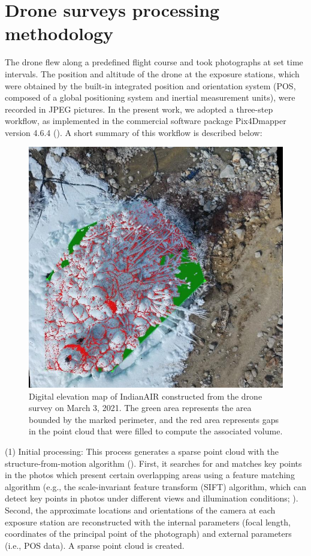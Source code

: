 \section{Drone surveys processing methodology}
\label{sec:drone_method}

The drone flew along a predefined flight course and took photographs at set time intervals. The
position and altitude of the drone at the exposure stations, which were obtained by the built-in integrated
position and orientation system (POS, composed of a global positioning system and inertial measurement units),
were recorded in JPEG pictures. In the present work, we adopted a three-step workflow, as implemented in the
commercial software package Pix4Dmapper version 4.6.4 (\cite{pix4dsaPix4DmapperUserManual2020}). A short summary of this workflow is
described below:

\begin{figure}
	\begin{center}
		\includegraphics[width=12 cm]{figs/pix4d.jpg}
	\end{center}
	\caption{Digital elevation map of Indian\ac{AIR} constructed from the drone survey on March 3, 2021. The green
		area represents the area bounded by the marked perimeter, and the red area represents gaps in the point cloud
    that were filled to compute the associated volume.
	}
	\label{fig:DEM}
\end{figure}

(1) Initial processing: This process generates a sparse point cloud with the structure-from-motion algorithm
(\cite{turnerAutomatedTechniqueGenerating2012}). First, it searches for and matches key points in the photos which present certain overlapping
areas using a feature matching algorithm (e.g., the scale-invariant feature transform (SIFT) algorithm, which can
detect key points in photos under different views and illumination conditions;
\cite{loweDistinctiveImageFeatures2004}). Second, the approximate locations and orientations of the camera at
each exposure station are reconstructed with the internal parameters (focal length, coordinates of the principal
point of the photograph) and external parameters (i.e., POS data). A sparse point cloud is created.

